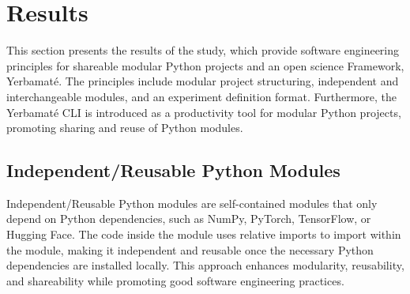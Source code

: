 \section{Results}

This section presents the results of the study, which provide software engineering principles for shareable modular Python projects and an open science Framework, Yerbamaté. The principles include modular project structuring, independent and interchangeable modules, and an experiment definition format.  Furthermore, the Yerbamaté CLI is introduced as a productivity tool for modular Python projects, promoting sharing and reuse of Python modules.

\subsection{Independent/Reusable Python Modules}

Independent/Reusable Python modules are self-contained modules that only depend on Python dependencies, such as NumPy, PyTorch, TensorFlow, or Hugging Face. The code inside the module uses relative imports to import within the module, making it independent and reusable once the necessary Python dependencies are installed locally. This approach enhances modularity, reusability, and shareability while promoting good software engineering practices.

